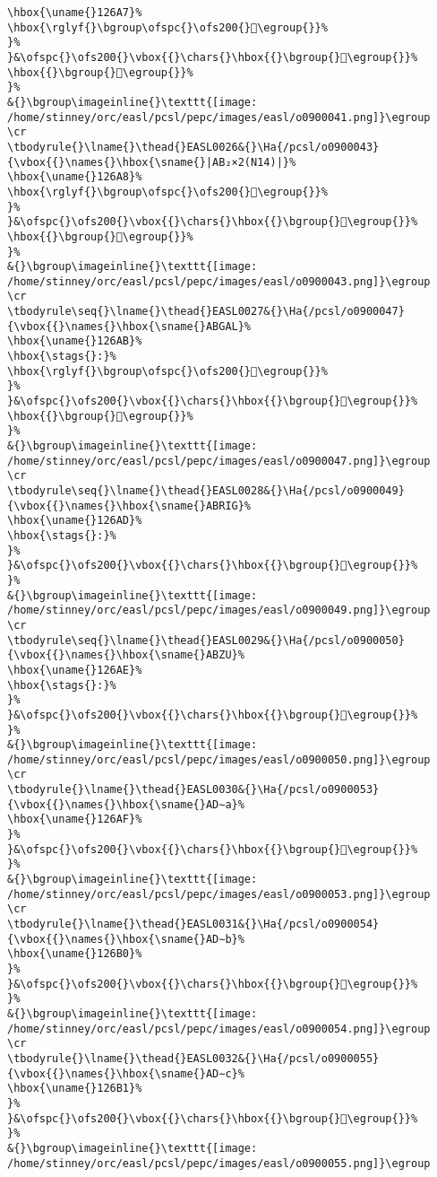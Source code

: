 \begin{verbatim}
\hbox{\uname{}126A7}%
\hbox{\rglyf{}\bgroup\ofspc{}\ofs200{}𒚧\egroup{}}%
}%
}&\ofspc{}\ofs200{}\vbox{{}\chars{}\hbox{{}\bgroup{}𒚧\egroup{}}%
\hbox{{}\bgroup{}𒚩\egroup{}}%
}%
&{}\bgroup\imageinline{}\texttt{[image: /home/stinney/orc/easl/pcsl/pepc/images/easl/o0900041.png]}\egroup
\cr
\tbodyrule{}\lname{}\thead{}EASL0026&{}\Ha{/pcsl/o0900043}{\vbox{{}\names{}\hbox{\sname{}|AB₂×2(N14)|}%
\hbox{\uname{}126A8}%
\hbox{\rglyf{}\bgroup\ofspc{}\ofs200{}𒚨\egroup{}}%
}%
}&\ofspc{}\ofs200{}\vbox{{}\chars{}\hbox{{}\bgroup{}𒚪\egroup{}}%
\hbox{{}\bgroup{}𒚨\egroup{}}%
}%
&{}\bgroup\imageinline{}\texttt{[image: /home/stinney/orc/easl/pcsl/pepc/images/easl/o0900043.png]}\egroup
\cr
\tbodyrule\seq{}\lname{}\thead{}EASL0027&{}\Ha{/pcsl/o0900047}{\vbox{{}\names{}\hbox{\sname{}ABGAL}%
\hbox{\uname{}126AB}%
\hbox{\stags{}:}%
\hbox{\rglyf{}\bgroup\ofspc{}\ofs200{}𒚫\egroup{}}%
}%
}&\ofspc{}\ofs200{}\vbox{{}\chars{}\hbox{{}\bgroup{}𒚫\egroup{}}%
\hbox{{}\bgroup{}𒚬\egroup{}}%
}%
&{}\bgroup\imageinline{}\texttt{[image: /home/stinney/orc/easl/pcsl/pepc/images/easl/o0900047.png]}\egroup
\cr
\tbodyrule\seq{}\lname{}\thead{}EASL0028&{}\Ha{/pcsl/o0900049}{\vbox{{}\names{}\hbox{\sname{}ABRIG}%
\hbox{\uname{}126AD}%
\hbox{\stags{}:}%
}%
}&\ofspc{}\ofs200{}\vbox{{}\chars{}\hbox{{}\bgroup{}𒚭\egroup{}}%
}%
&{}\bgroup\imageinline{}\texttt{[image: /home/stinney/orc/easl/pcsl/pepc/images/easl/o0900049.png]}\egroup
\cr
\tbodyrule\seq{}\lname{}\thead{}EASL0029&{}\Ha{/pcsl/o0900050}{\vbox{{}\names{}\hbox{\sname{}ABZU}%
\hbox{\uname{}126AE}%
\hbox{\stags{}:}%
}%
}&\ofspc{}\ofs200{}\vbox{{}\chars{}\hbox{{}\bgroup{}𒚮\egroup{}}%
}%
&{}\bgroup\imageinline{}\texttt{[image: /home/stinney/orc/easl/pcsl/pepc/images/easl/o0900050.png]}\egroup
\cr
\tbodyrule{}\lname{}\thead{}EASL0030&{}\Ha{/pcsl/o0900053}{\vbox{{}\names{}\hbox{\sname{}AD∼a}%
\hbox{\uname{}126AF}%
}%
}&\ofspc{}\ofs200{}\vbox{{}\chars{}\hbox{{}\bgroup{}𒚯\egroup{}}%
}%
&{}\bgroup\imageinline{}\texttt{[image: /home/stinney/orc/easl/pcsl/pepc/images/easl/o0900053.png]}\egroup
\cr
\tbodyrule{}\lname{}\thead{}EASL0031&{}\Ha{/pcsl/o0900054}{\vbox{{}\names{}\hbox{\sname{}AD∼b}%
\hbox{\uname{}126B0}%
}%
}&\ofspc{}\ofs200{}\vbox{{}\chars{}\hbox{{}\bgroup{}𒚰\egroup{}}%
}%
&{}\bgroup\imageinline{}\texttt{[image: /home/stinney/orc/easl/pcsl/pepc/images/easl/o0900054.png]}\egroup
\cr
\tbodyrule{}\lname{}\thead{}EASL0032&{}\Ha{/pcsl/o0900055}{\vbox{{}\names{}\hbox{\sname{}AD∼c}%
\hbox{\uname{}126B1}%
}%
}&\ofspc{}\ofs200{}\vbox{{}\chars{}\hbox{{}\bgroup{}𒚱\egroup{}}%
}%
&{}\bgroup\imageinline{}\texttt{[image: /home/stinney/orc/easl/pcsl/pepc/images/easl/o0900055.png]}\egroup

\end{verbatim}
